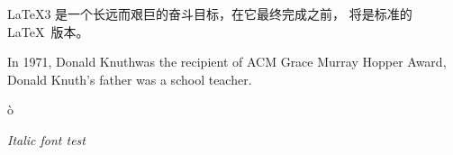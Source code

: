 \documentclass{ctexart}
\newcommand{\mycmdA}{Donald Knuth}
\begin{document}
\LaTeX3 是一个长远而艰巨的奋斗目标，在它最终完成之前，\LaTeXe{} 将是标准的 \LaTeX\ 版本。
\par
In 1971, \mycmdA was the recipient of ACM Grace Murray Hopper Award, \mycmdA 's father was a school teacher.

\`o

\textit{Italic font test}
\end{document}
